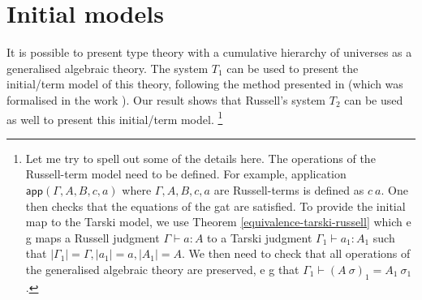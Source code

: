 \documentclass[11pt,a4paper]{article}
\theoremstyle{definition}
\newcommand{\APP}{\mathsf{app}}
\begin{document}
\section{Initial models}

It is possible to present type theory with a cumulative hierarchy of universes as a generalised algebraic theory.
The system $T_1$ can be used to present the initial/term model of this theory, following the method presented in \cite{Streicher:semtt}
(which was formalised in the work \cite{brunerie:initiality}).
Our result shows that Russell's system $T_2$ can be used as well to present this initial/term model.
\footnote{Let me try to spell out some of the details here. The operations of the Russell-term model need to be defined. For example, application $\APP(\Gamma,A,B,c,a)$ where $\Gamma,A,B,c,a$ are Russell-terms is defined as $c~a$. One then checks that the equations of the gat are satisfied. To provide the initial map to the Tarski model, we use Theorem \ref{equivalence-tarski-russell} which e g maps a Russell judgment $\Gamma \vdash a : A$ to a Tarski judgment $\Gamma_1 \vdash a_1 : A_1$ such that 
$| \Gamma_1 | = \Gamma, | a_1 | = a, | A_1 | = A$. 
We then need to check that all operations of the generalised algebraic theory are preserved, e g
that $\Gamma_1 \vdash (A~\sigma)_1 = A_1~\sigma_1$.
}





\end{document}
